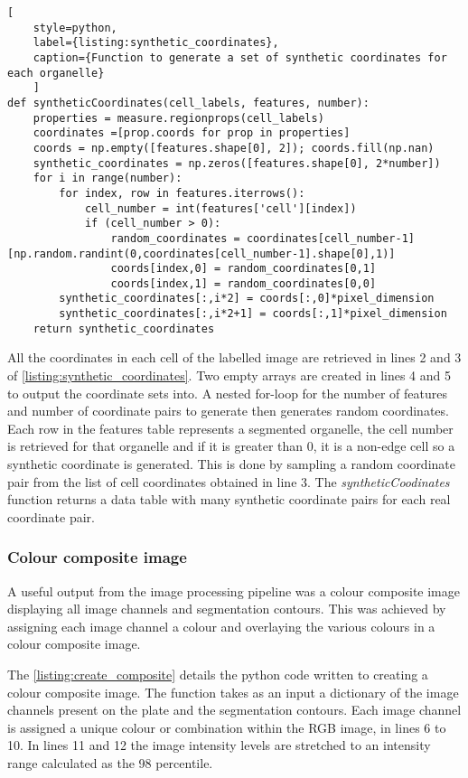 \begin{lstlisting}[
	style=python,
	label={listing:synthetic_coordinates},
	caption={Function to generate a set of synthetic coordinates for each organelle}
	]
def syntheticCoordinates(cell_labels, features, number):
    properties = measure.regionprops(cell_labels)
    coordinates =[prop.coords for prop in properties] 
    coords = np.empty([features.shape[0], 2]); coords.fill(np.nan)
    synthetic_coordinates = np.zeros([features.shape[0], 2*number])
    for i in range(number):
        for index, row in features.iterrows():
            cell_number = int(features['cell'][index])
            if (cell_number > 0):
                random_coordinates = coordinates[cell_number-1][np.random.randint(0,coordinates[cell_number-1].shape[0],1)]
                coords[index,0] = random_coordinates[0,1]
                coords[index,1] = random_coordinates[0,0]
        synthetic_coordinates[:,i*2] = coords[:,0]*pixel_dimension
        synthetic_coordinates[:,i*2+1] = coords[:,1]*pixel_dimension
    return synthetic_coordinates
\end{lstlisting}

All the coordinates in each cell of the labelled image are retrieved in lines 2 and 3 of \autoref{listing:synthetic_coordinates}. Two empty arrays are created in lines 4 and 5 to output the coordinate sets into. A nested for-loop for the number of features and number of coordinate pairs to generate then generates random coordinates. Each row in the features table represents a segmented organelle, the cell number is retrieved for that organelle and if it is greater than 0, it is a non-edge cell so a synthetic coordinate is generated. This is done by sampling a random coordinate pair from the list of cell coordinates obtained in line 3. The \emph{syntheticCoodinates} function returns a data table with many synthetic coordinate pairs for each real coordinate pair.

\subsubsection{Colour composite image}
A useful output from the image processing pipeline was a colour composite image displaying all image channels and segmentation contours. This was achieved by assigning each image channel a colour and overlaying the various colours in a colour composite image.

The \autoref{listing:create_composite} details the python code written to creating a colour composite image. The function takes as an input a dictionary of the image channels present on the plate and the segmentation contours. Each image channel is assigned a unique colour or combination within the RGB image, in lines 6 to 10. In lines 11 and 12 the image intensity levels are stretched to an intensity range calculated as the 98 percentile.

